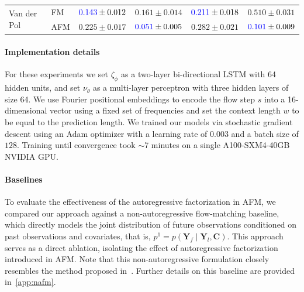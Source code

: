 \documentclass[a4paper,10pt,twocolumn,preprint,3p]{elsarticle}
\begin{document}
\begin{table}[ht]
\begin{small}
\begin{tabular}{l l cc cc}
        \midrule
        \multirow{2}{*}{Van der Pol} 
            & FM  & $\textcolor{blue}{0.143} \pm 0.012$ & $0.161 \pm 0.014$ & $\textcolor{blue}{0.211} \pm 0.018$ & $0.510 \pm 0.031$ \\
            & AFM & $0.225 \pm 0.017$ & $\textcolor{blue}{0.051} \pm 0.005$ & $0.282 \pm 0.021$ & $\textcolor{blue}{0.101} \pm 0.009$ \\
        \bottomrule
    \end{tabular}
    \end{small}
    \label{table:dynamical_systems}
\end{table}

\paragraph{Implementation details} For these experiments we set $\zeta_\phi$ as a two-layer bi-directional LSTM with 64 hidden units, and set $\nu_{\theta}$ as a multi-layer perceptron with three hidden layers of size 64. We use Fourier positional embeddings to encode the flow step $s$ into a 16-dimensional vector using a fixed set of frequencies and set the context length $w$ to be equal to the prediction length. We trained our models via stochastic gradient descent using an Adam optimizer with a learning rate of $0.003$ and a batch size of $128$. Training until convergence took $\sim$7 minutes on a single A100-SXM4-40GB NVIDIA GPU. 


\paragraph{Baselines} To evaluate the effectiveness of the autoregressive factorization in AFM, we compared our approach against a non-autoregressive flow-matching baseline, which directly models the joint distribution of future observations conditioned on past observations and covariates, that is,  ${p^1 =p(\mathbf{Y}_f \mid \mathbf{Y}_l, \mathbf{C})}$. 
This approach serves as a direct ablation, isolating the effect of autoregressive factorization introduced in AFM. Note that this non-autoregressive formulation closely resembles the method proposed in~\citep{Kerrigan2024Flow}. Further details on this baseline are provided in~\ref{app:nafm}.
\end{document}
